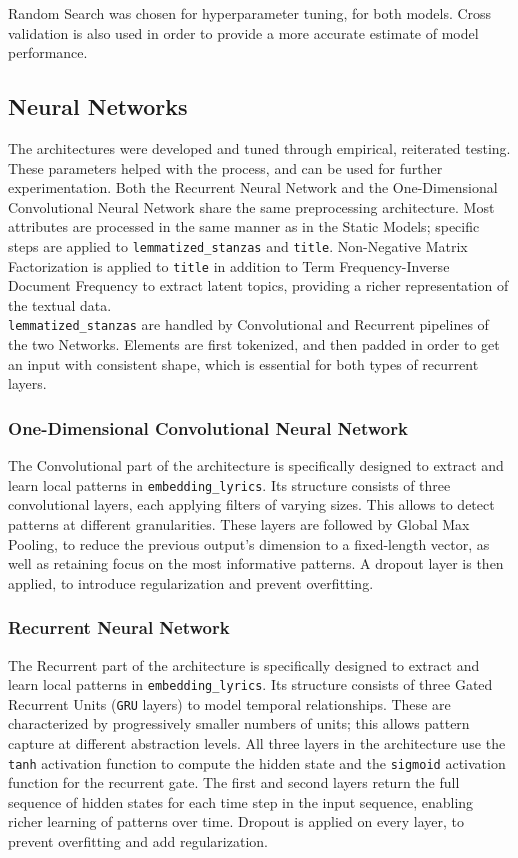Random Search was chosen for hyperparameter tuning, for both models.
Cross validation is also used in order to provide a more accurate
estimate of model performance.

\subsection*{Neural Networks}
The architectures were developed and tuned through empirical,
reiterated testing. These parameters helped with the process, and can
be used for further experimentation.
Both the Recurrent Neural Network and the One-Dimensional Convolutional
Neural Network share the same preprocessing
architecture. Most attributes are processed in the same manner as in
the Static Models; specific steps are applied to \texttt{lemmatized\_stanzas}
and \texttt{title}.
Non-Negative Matrix Factorization is applied to \texttt{title} in addition to
Term Frequency-Inverse Document Frequency
to extract latent topics, providing a richer representation of the
textual data.\\

\texttt{lemmatized\_stanzas} are handled by Convolutional and Recurrent
pipelines of the two Networks.
Elements are first tokenized, and then padded in order to
get an input with consistent shape, which is essential for both types of
recurrent layers.\\

\subsubsection*{One-Dimensional Convolutional Neural Network}
The Convolutional part of the architecture is specifically designed to extract and learn
local patterns in \texttt{embedding\_lyrics}.
Its structure consists of three convolutional layers, each applying filters of
varying sizes. This allows to detect patterns at different granularities.
These layers are followed by Global Max Pooling, to reduce the previous output's
dimension to a fixed-length vector, as well as retaining focus on the most
informative patterns.
A dropout layer is then applied, to introduce regularization and prevent
overfitting.


\subsubsection*{Recurrent Neural Network}
The Recurrent part of the architecture is specifically designed to extract and learn
local patterns in \texttt{embedding\_lyrics}.
Its structure consists of three Gated Recurrent Units (\texttt{GRU} layers)
to model temporal relationships. These are characterized by progressively smaller
numbers of units; this allows pattern capture at different abstraction levels.
All three layers in the architecture use the \texttt{tanh} activation function
to compute the hidden state and
the \texttt{sigmoid} activation function for the recurrent gate.
The first and second layers return the full sequence of hidden states for each
time step in the input sequence, enabling richer learning of patterns over time.
Dropout is applied on every layer, to prevent overfitting and add regularization.


